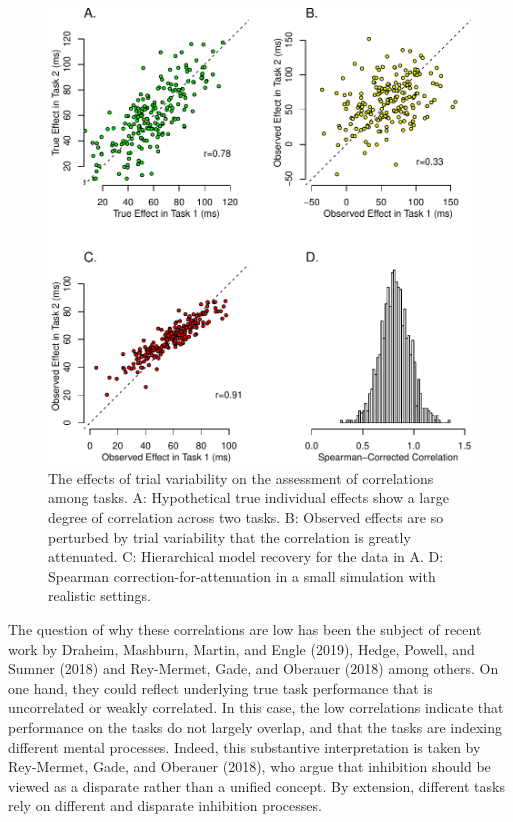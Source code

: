 \documentclass[
  english,
  ,man]{apa6}
\begin{document}
\begin{figure}
\centering
\includegraphics{p_files/figure-latex/example-1.pdf}
\caption{\label{fig:example}The effects of trial variability on the assessment of correlations among tasks. A: Hypothetical true individual effects show a large degree of correlation across two tasks. B: Observed effects are so perturbed by trial variability that the correlation is greatly attenuated. C: Hierarchical model recovery for the data in A. D: Spearman correction-for-attenuation in a small simulation with realistic settings.}
\end{figure}

The question of why these correlations are low has been the subject of recent work by Draheim, Mashburn, Martin, and Engle (2019), Hedge, Powell, and Sumner (2018) and Rey-Mermet, Gade, and Oberauer (2018) among others. On one hand, they could reflect underlying true task performance that is uncorrelated or weakly correlated. In this case, the low correlations indicate that performance on the tasks do not largely overlap, and that the tasks are indexing different mental processes. Indeed, this substantive interpretation is taken by Rey-Mermet, Gade, and Oberauer (2018), who argue that inhibition should be viewed as a disparate rather than a unified concept. By extension, different tasks rely on different and disparate inhibition processes.
\end{document}
